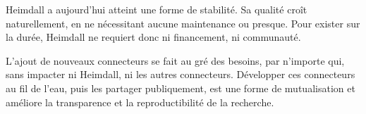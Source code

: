 \documentclass[final,fra]{anthology-ch}         %
\begin{document}
Heimdall a aujourd'hui atteint une forme de stabilité. Sa qualité croît naturellement, en ne nécessitant aucune maintenance ou presque. Pour exister sur la durée, Heimdall ne requiert donc ni financement, ni communauté.

L'ajout de nouveaux connecteurs se fait au gré des besoins, par n'importe qui, sans impacter ni Heimdall, ni les autres connecteurs. Développer ces connecteurs au fil de l'eau, puis les partager publiquement, est une forme de mutualisation et améliore la transparence et la reproductibilité de la recherche.


\printbibliography


\end{document}
